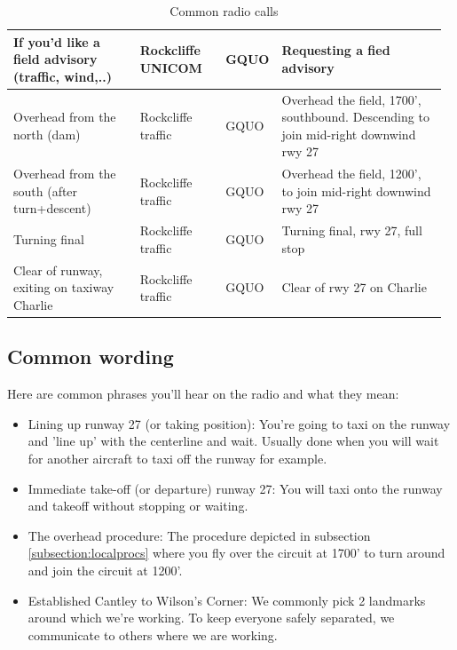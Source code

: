 \documentclass[12pt,letterpaper]{article}
\begin{document}
\begin{table}[]
\begin{tabular}{| p{0.30\linewidth} |  p{0.20\linewidth} | p{0.07\linewidth} |  p{0.40\linewidth} |}
        If you’d like a field advisory (traffic, wind,..) & Rockcliffe UNICOM & GQUO & Requesting a fied advisory\\
        \hline
        
        Overhead from the north (dam) & Rockcliffe traffic & GQUO & Overhead the field, 1700’, southbound. Descending to join mid-right downwind rwy 27\\
        \hline
        
        Overhead from the south (after turn+descent) & Rockcliffe traffic & GQUO & Overhead the field, 1200’, to join mid-right downwind rwy 27\\
        \hline
        
        Turning final & Rockcliffe traffic & GQUO & Turning final, rwy 27, full stop\\
        \hline
        
        Clear of runway, exiting on taxiway Charlie & Rockcliffe traffic & GQUO & Clear of rwy 27 on Charlie\\
        \hline
        
        \end{tabular}
        \hspace*{-1cm}
        \caption{Common radio calls}
        \label{tab:radiocalls}
    \end{table}
    
    \subsection{Common wording}
    Here are common phrases you'll hear on the radio and what they mean:
    \begin{itemize}
        \item Lining up runway 27 (or taking position): You're going to taxi on the runway and 'line up' with the centerline and wait. Usually done when you will wait for another aircraft to taxi off the runway for example.
        \item Immediate take-off (or departure) runway 27: You will taxi onto the runway and takeoff without stopping or waiting. 
        \item The overhead procedure: The procedure depicted in subsection \ref{subsection:localprocs} where you fly over the circuit at 1700' to turn around and join the circuit at 1200'.
        \item Established Cantley to Wilson's Corner: We commonly pick 2 landmarks around which we're working. To keep everyone safely separated, we communicate to others where we are working.
    \end{itemize}
\end{document}
